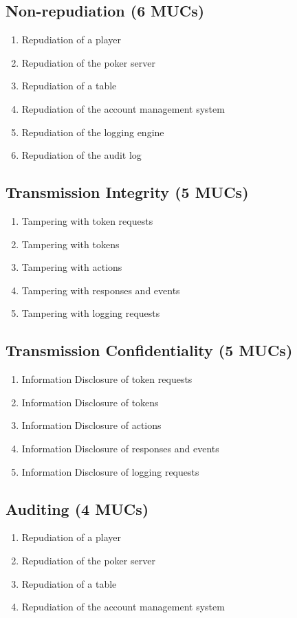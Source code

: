 \documentclass[a4paper,11pt]{report}
\begin{document}
\subsection{Non-repudiation (6 MUCs)}
\begin{enumerate}
\item Repudiation of a player
\item Repudiation of the poker server
\item Repudiation of a table
\item Repudiation of the account management system
\item Repudiation of the logging engine 
\item Repudiation of the audit log
\end{enumerate}

\subsection{Transmission Integrity (5 MUCs)}
\begin{enumerate}
\item Tampering with token requests
\item Tampering with tokens
\item Tampering with actions
\item Tampering with responses and events 
\item Tampering with logging requests 
\end{enumerate}

\subsection{Transmission Confidentiality (5 MUCs)}
\begin{enumerate}
\item Information Disclosure of token requests
\item Information Disclosure of tokens
\item Information Disclosure of actions
\item Information Disclosure of responses and events
\item Information Disclosure of logging requests 
\end{enumerate}

\subsection{Auditing (4 MUCs)}
\begin{enumerate}
\item Repudiation of a player
\item Repudiation of the poker server
\item Repudiation of a table
\item Repudiation of the account management system
\end{enumerate}
\end{document}

